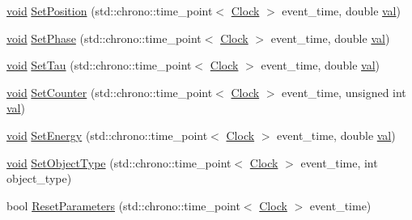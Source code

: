 \begin{DoxyCompactItemize}
\item 
\mbox{\hyperlink{glad_8h_a950fc91edb4504f62f1c577bf4727c29}{void}} \mbox{\hyperlink{class_orbital_a16ff46f7e720f2f7aed332585310a9b8}{Set\+Position}} (std\+::chrono\+::time\+\_\+point$<$ \mbox{\hyperlink{universe_8h_a0ef8d951d1ca5ab3cfaf7ab4c7a6fd80}{Clock}} $>$ event\+\_\+time, double \mbox{\hyperlink{glad_8h_a26942fd2ed566ef553eae82d2c109c8f}{val}})
\item 
\mbox{\hyperlink{glad_8h_a950fc91edb4504f62f1c577bf4727c29}{void}} \mbox{\hyperlink{class_orbital_ac1c58fcb56e4d5c19c4ab39cc09c88ad}{Set\+Phase}} (std\+::chrono\+::time\+\_\+point$<$ \mbox{\hyperlink{universe_8h_a0ef8d951d1ca5ab3cfaf7ab4c7a6fd80}{Clock}} $>$ event\+\_\+time, double \mbox{\hyperlink{glad_8h_a26942fd2ed566ef553eae82d2c109c8f}{val}})
\item 
\mbox{\hyperlink{glad_8h_a950fc91edb4504f62f1c577bf4727c29}{void}} \mbox{\hyperlink{class_orbital_afd09baa67f1a9bff08c74dcf60e1398a}{Set\+Tau}} (std\+::chrono\+::time\+\_\+point$<$ \mbox{\hyperlink{universe_8h_a0ef8d951d1ca5ab3cfaf7ab4c7a6fd80}{Clock}} $>$ event\+\_\+time, double \mbox{\hyperlink{glad_8h_a26942fd2ed566ef553eae82d2c109c8f}{val}})
\item 
\mbox{\hyperlink{glad_8h_a950fc91edb4504f62f1c577bf4727c29}{void}} \mbox{\hyperlink{class_orbital_ae2a2fb06700d1d68501b0cbdea87cc08}{Set\+Counter}} (std\+::chrono\+::time\+\_\+point$<$ \mbox{\hyperlink{universe_8h_a0ef8d951d1ca5ab3cfaf7ab4c7a6fd80}{Clock}} $>$ event\+\_\+time, unsigned int \mbox{\hyperlink{glad_8h_a26942fd2ed566ef553eae82d2c109c8f}{val}})
\item 
\mbox{\hyperlink{glad_8h_a950fc91edb4504f62f1c577bf4727c29}{void}} \mbox{\hyperlink{class_orbital_a20b0f4d549fd9024df89603a5adcc214}{Set\+Energy}} (std\+::chrono\+::time\+\_\+point$<$ \mbox{\hyperlink{universe_8h_a0ef8d951d1ca5ab3cfaf7ab4c7a6fd80}{Clock}} $>$ event\+\_\+time, double \mbox{\hyperlink{glad_8h_a26942fd2ed566ef553eae82d2c109c8f}{val}})
\item 
\mbox{\hyperlink{glad_8h_a950fc91edb4504f62f1c577bf4727c29}{void}} \mbox{\hyperlink{class_orbital_afd0dfd382d4bf7d9fbace315bd37fa85}{Set\+Object\+Type}} (std\+::chrono\+::time\+\_\+point$<$ \mbox{\hyperlink{universe_8h_a0ef8d951d1ca5ab3cfaf7ab4c7a6fd80}{Clock}} $>$ event\+\_\+time, int object\+\_\+type)
\item 
bool \mbox{\hyperlink{class_orbital_acc6137a5a79be91a255f685a2f065330}{Reset\+Parameters}} (std\+::chrono\+::time\+\_\+point$<$ \mbox{\hyperlink{universe_8h_a0ef8d951d1ca5ab3cfaf7ab4c7a6fd80}{Clock}} $>$ event\+\_\+time)

\end{DoxyCompactItemize}
